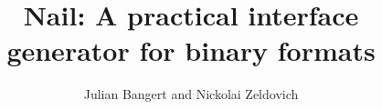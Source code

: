 \documentclass[10pt]{article}
\begin{document}
\author{Julian Bangert and Nickolai Zeldovich}
\date{}
\title{Nail: A practical interface generator for binary formats}

\maketitle










\end{document}
